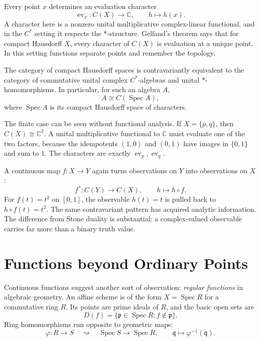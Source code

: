 Every point $x$ determines an evaluation character
\[
 \operatorname{ev}_x:C(X)\to\mathbb C,\qquad h\mapsto h(x).
\]
A character here is a nonzero unital multiplicative complex-linear functional, and in the $C^*$ setting it respects the $*$-structure. Gelfand's theorem says that for compact Hausdorff $X$, every character of $C(X)$ is evaluation at a unique point. In this setting functions separate points and remember the topology.

\begin{theorem}
The category of compact Hausdorff spaces is contravariantly equivalent to the category of commutative unital complex $C^*$-algebras and unital $*$-homomorphisms. In particular, for such an algebra $A$,
\[
 \boxed{A\cong C(\operatorname{Spec}A),}
\]
where $\operatorname{Spec}A$ is its compact Hausdorff space of characters.
\end{theorem}

The finite case can be seen without functional analysis. If $X=\{p,q\}$, then $C(X)\cong\mathbb C^2$. A unital multiplicative functional to $\mathbb C$ must evaluate one of the two factors, because the idempotents $(1,0)$ and $(0,1)$ have images in $\{0,1\}$ and sum to $1$. The characters are exactly $\operatorname{ev}_p,\operatorname{ev}_q$.

A continuous map $f:X\to Y$ again turns observations on $Y$ into observations on $X$:
\[
 f^*:C(Y)\to C(X),\qquad h\longmapsto h\circ f.
\]
For $f(t)=t^2$ on $[0,1]$, the observable $h(t)=t$ is pulled back to $h\circ f(t)=t^2$. The same contravariant pattern has acquired analytic information. The difference from Stone duality is substantial: a complex-valued observable carries far more than a binary truth value.


\section{Functions beyond Ordinary Points}

Continuous functions suggest another sort of observation: \emph{regular functions} in algebraic geometry. An affine scheme is of the form $X=\operatorname{Spec}R$ for a commutative ring $R$. Its points are prime ideals of $R$, and the basic open sets are
\[
 D(f)=\{\mathfrak p\in\operatorname{Spec}R:f\notin\mathfrak p\}.
\]
Ring homomorphisms run opposite to geometric maps:
\[
 \varphi:R\to S
 \quad\rightsquigarrow\quad
 \operatorname{Spec}S\to\operatorname{Spec}R,
 \qquad\mathfrak q\mapsto\varphi^{-1}(\mathfrak q).
\]

